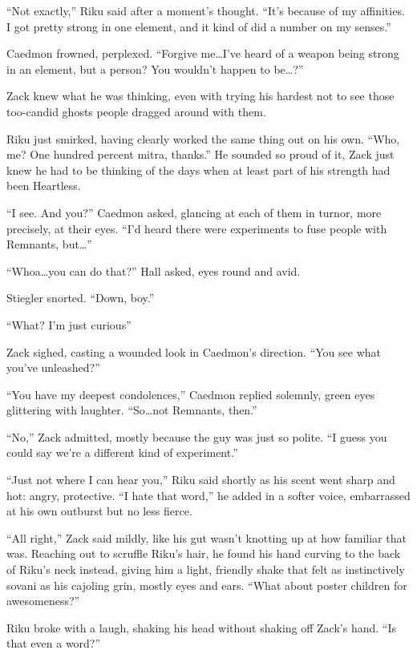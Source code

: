 ``Not exactly,'' Riku said after a moment's thought. ``It's because of my affinities. I got pretty strong in one element, and it kind of did a number on my senses.''

Caedmon frowned, perplexed. ``Forgive me\ldots I've heard of a weapon being strong in an element, but a person? You wouldn't happen to be\ldots ?''

Zack knew what he was thinking, even with trying his hardest not to see those too-candid ghosts people dragged around with them.

Riku just smirked, having clearly worked the same thing out on his own. ``Who, me? One hundred percent mitra, thanks.'' He sounded so proud of it, Zack just knew he had to be thinking of the days when at least part of his strength had been Heartless.

``I see. And you?'' Caedmon asked, glancing at each of them in turn\textemdash or, more precisely, at their eyes. ``I'd heard there were experiments to fuse people with Remnants, but\ldots ''

``Whoa\ldots you can do that?'' Hall asked, eyes round and avid.

Stiegler snorted. ``Down, boy.''

``What? I'm just curious\textemdash ''

Zack sighed, casting a wounded look in Caedmon's direction. ``You see what you've unleashed?''

``You have my deepest condolences,'' Caedmon replied solemnly, green eyes glittering with laughter. ``So\ldots not Remnants, then.''

``No,'' Zack admitted, mostly because the guy was just so polite. ``I guess you could say we're a different kind of experiment.''

``Just not where I can hear you,'' Riku said shortly as his scent went sharp and hot: angry, protective. ``I hate that word,'' he added in a softer voice, embarrassed at his own outburst but no less fierce.

``All right,'' Zack said mildly, like his gut wasn't knotting up at how familiar that was. Reaching out to scruffle Riku's hair, he found his hand curving to the back of Riku's neck instead, giving him a light, friendly shake that felt as instinctively sovani as his cajoling grin, mostly eyes and ears. ``What about poster children for awesomeness?''

Riku broke with a laugh, shaking his head without shaking off Zack's hand. ``Is that even a word?''


